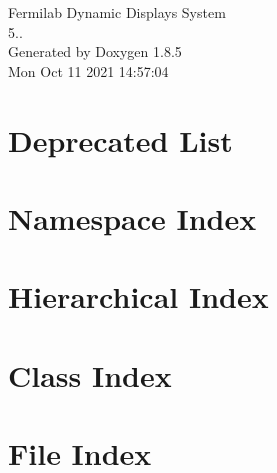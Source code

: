 \documentclass[twoside]{book}
\newcommand{\clearemptydoublepage}{%
  \newpage{\pagestyle{empty}\cleardoublepage}%
}
\begin{document}
\hypersetup{pageanchor=false}
\begin{titlepage}
\vspace*{7cm}
\begin{center}%
{\Large Fermilab Dynamic Displays System \\[1ex]\large 5.. }\\
\vspace*{1cm}
{\large Generated by Doxygen 1.8.5}\\
\vspace*{0.5cm}
{\small Mon Oct 11 2021 14:57:04}\\
\end{center}
\end{titlepage}
\clearemptydoublepage
\tableofcontents
\clearemptydoublepage
{}
\hypersetup{pageanchor=true}

\chapter{Deprecated List}
\label{deprecated}
\hypertarget{deprecated}{}

\chapter{Namespace Index}

\chapter{Hierarchical Index}

\chapter{Class Index}

\chapter{File Index}

\end{document}
